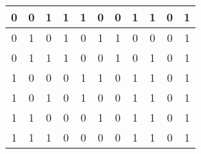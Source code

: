 \documentclass{article}
\begin{document}
\begin{enumerate}
\begin{enumerate}
\begin{center}
\begin{tabular}{|c|c|c|c|c|c|c|c|c|c|c|}
                            0   & 0   & 1   & 1              & 1              & 0              & 0                     & 1                     & 1          & 0                                                                  & 1                                                                      \\ \hline
                            0   & 1   & 0   & 1              & 0              & 1              & 1                     & 0                     & 0          & 0                                                                  & 1                                                                      \\ \hline
                            0   & 1   & 1   & 1              & 0              & 0              & 1                     & 0                     & 1          & 0                                                                  & 1                                                                      \\ \hline
                            1   & 0   & 0   & 0              & 1              & 1              & 0                     & 1                     & 1          & 0                                                                  & 1                                                                      \\ \hline
                            1   & 0   & 1   & 0              & 1              & 0              & 0                     & 1                     & 1          & 0                                                                  & 1                                                                      \\ \hline
                            1   & 1   & 0   & 0              & 0              & 1              & 0                     & 1                     & 1          & 0                                                                  & 1                                                                      \\ \hline
                            1   & 1   & 1   & 0              & 0              & 0              & 0                     & 1                     & 1          & 0                                                                  & 1                                                                      \\ \hline
                        \end{tabular}
                    \end{center}
          \end{enumerate}

\end{enumerate}
\end{document}

